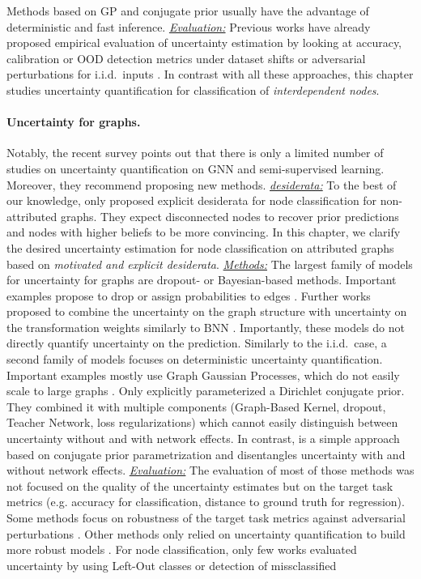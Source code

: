 Methods based on GP and conjugate prior usually have the advantage of deterministic and fast inference. \emph{\underline{Evaluation:}} Previous works have already proposed empirical evaluation of uncertainty estimation by looking at accuracy, calibration or OOD detection metrics under dataset shifts or adversarial perturbations for i.i.d.\ inputs \citep{dataset-shift, robustness-uncertainty-dirichlet}. In contrast with all these approaches, this chapter studies uncertainty quantification for classification of \emph{interdependent nodes}.

\paragraph{Uncertainty for graphs.} Notably, the recent survey \citep{review-uncertainty-dl} points out that there is only a limited number of studies on uncertainty quantification on GNN and semi-supervised learning. Moreover, they recommend proposing new methods. \emph{\underline{desiderata:}} To the best of our knowledge, only \citep{Eswaran2017} proposed explicit desiderata for node classification for non-attributed graphs. They expect disconnected nodes to recover prior predictions and nodes with higher beliefs to be more convincing. In this chapter, we clarify the desired uncertainty estimation for node classification on attributed graphs based on \emph{motivated and explicit desiderata}. \emph{\underline{Methods:}} The largest family of models for uncertainty for graphs are dropout- or Bayesian-based methods. Important examples propose to drop or assign probabilities to edges \citep{Rong2019, Chen2018, Hasanzadeh2020, Dallachiesa2014, Hu2017}. Further works proposed to combine the uncertainty on the graph structure with uncertainty on the transformation weights similarly to BNN \citep{Elinas2019, Zhang2019b, Pal2019a, Pal2019b}. Importantly, these models do not directly quantify uncertainty on the prediction. Similarly to the i.i.d.\ case, a second family of models focuses on deterministic uncertainty quantification. Important examples mostly use Graph Gaussian Processes, which do not easily scale to large graphs \citep{Ng2018, Zhi2020, Liu2020c, Borovitskiy2020}. Only \citep{Zhao2020} explicitly parameterized a Dirichlet conjugate prior. They combined it with multiple components (Graph-Based Kernel, dropout, Teacher Network, loss regularizations) which cannot easily distinguish between uncertainty without and with network effects. In contrast, \GPNacro{} is a simple approach based on conjugate prior parametrization and disentangles uncertainty with and without network effects. \emph{\underline{Evaluation:}} The evaluation of most of those methods was not focused on the quality of the uncertainty estimates but on the target task metrics (e.g. accuracy for classification, distance to ground truth for regression). Some methods focus on robustness of the target task metrics against adversarial perturbations \citep{GNNBook-ch8-gunnemann, zugner2018adversarial, zugner2019adversarial}. Other methods only relied on uncertainty quantification to build more robust models \citep{Zhu2019, Feng2020}. For node classification, only few works evaluated uncertainty by using Left-Out classes or detection of missclassified 